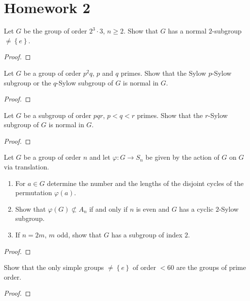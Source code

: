 \section{Homework 2}
\setcounter{exercise}{0}
\setcounter{equation}{0}
\begin{problem}
Let $G$ be the group of order $2^3\cdot 3$, $n\geq 2$. Show that $G$ has a
normal $2$-subgroup $\neq\left\{e\right\}$.
\end{problem}
\begin{proof}
\end{proof}

\begin{problem}
Let $G$ be a group of order $p^2q$, $p$ and $q$ primes. Show that the Sylow
$p$-Sylow subgroup or the $q$-Sylow subgroup of $G$ is normal in $G$.
\end{problem}
\begin{proof}
\end{proof}

\begin{problem}
Let $G$ be a subgroup of order $pqr$, $p<q<r$ primes. Show that the
$r$-Sylow subgroup of $G$ is normal in $G$.
\end{problem}
\begin{proof}
\end{proof}

\begin{problem}
Let $G$ be a group of order $n$ and let $\varphi\colon G\to S_n$ be given by
the action of $G$ on $G$ via translation.
\begin{enumerate}[label=(\alph*)]
\item For $a\in G$ determine the number and the lengths of the disjoint
  cycles of the permutation $\varphi(a)$.
\item Show that $\varphi(G)\nsubset A_n$ if and only if $n$ is even and $G$
  has a cyclic $2$-Sylow subgroup.
\item If $n=2m$, $m$ odd, show that $G$ has a subgroup of index $2$.
\end{enumerate}
\end{problem}
\begin{proof}
\end{proof}

\begin{problem}
Show that the only simple groups $\neq\left\{e\right\}$ of order $<60$ are
the groups of prime order.
\end{problem}
\begin{proof}
\end{proof}

